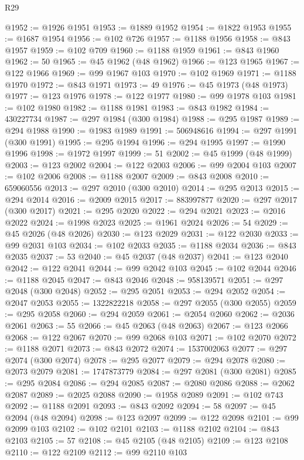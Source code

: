 \begin{lexlean}{R29}
\begin{coremodule}
@1952 := @1926 @1951
@1953 := @1889 @1952
@1954 := @1822 @1953
@1955 := @1687 @1954
@1956 := @102 @726
@1957 := @1188 @1956
@1958 := @843 @1957
@1959 := @102 @709
@1960 := @1188 @1959
@1961 := @843 @1960
@1962 := 50
@1965 := @45 @1962 (@48 @1962)
@1966 := @123 @1965
@1967 := @122 @1966
@1969 := @99 @1967 @103
@1970 := @102 @1969
@1971 := @1188 @1970
@1972 := @843 @1971
@1973 := 49
@1976 := @45 @1973 (@48 @1973)
@1977 := @123 @1976
@1978 := @122 @1977
@1980 := @99 @1978 @103
@1981 := @102 @1980
@1982 := @1188 @1981
@1983 := @843 @1982
@1984 := 430227734
@1987 := @297 @1984 (@300 @1984)
@1988 := @295 @1987
@1989 := @294 @1988
@1990 := @1983 @1989
@1991 := 506948616
@1994 := @297 @1991 (@300 @1991)
@1995 := @295 @1994
@1996 := @294 @1995
@1997 := @1990 @1996
@1998 := @1972 @1997
@1999 := 51
@2002 := @45 @1999 (@48 @1999)
@2003 := @123 @2002
@2004 := @122 @2003
@2006 := @99 @2004 @103
@2007 := @102 @2006
@2008 := @1188 @2007
@2009 := @843 @2008
@2010 := 659060556
@2013 := @297 @2010 (@300 @2010)
@2014 := @295 @2013
@2015 := @294 @2014
@2016 := @2009 @2015
@2017 := 883997877
@2020 := @297 @2017 (@300 @2017)
@2021 := @295 @2020
@2022 := @294 @2021
@2023 := @2016 @2022
@2024 := @1998 @2023
@2025 := @1961 @2024
@2026 := 54
@2029 := @45 @2026 (@48 @2026)
@2030 := @123 @2029
@2031 := @122 @2030
@2033 := @99 @2031 @103
@2034 := @102 @2033
@2035 := @1188 @2034
@2036 := @843 @2035
@2037 := 53
@2040 := @45 @2037 (@48 @2037)
@2041 := @123 @2040
@2042 := @122 @2041
@2044 := @99 @2042 @103
@2045 := @102 @2044
@2046 := @1188 @2045
@2047 := @843 @2046
@2048 := 958139571
@2051 := @297 @2048 (@300 @2048)
@2052 := @295 @2051
@2053 := @294 @2052
@2054 := @2047 @2053
@2055 := 1322822218
@2058 := @297 @2055 (@300 @2055)
@2059 := @295 @2058
@2060 := @294 @2059
@2061 := @2054 @2060
@2062 := @2036 @2061
@2063 := 55
@2066 := @45 @2063 (@48 @2063)
@2067 := @123 @2066
@2068 := @122 @2067
@2070 := @99 @2068 @103
@2071 := @102 @2070
@2072 := @1188 @2071
@2073 := @843 @2072
@2074 := 1537002063
@2077 := @297 @2074 (@300 @2074)
@2078 := @295 @2077
@2079 := @294 @2078
@2080 := @2073 @2079
@2081 := 1747873779
@2084 := @297 @2081 (@300 @2081)
@2085 := @295 @2084
@2086 := @294 @2085
@2087 := @2080 @2086
@2088 := @2062 @2087
@2089 := @2025 @2088
@2090 := @1958 @2089
@2091 := @102 @743
@2092 := @1188 @2091
@2093 := @843 @2092
@2094 := 58
@2097 := @45 @2094 (@48 @2094)
@2098 := @123 @2097
@2099 := @122 @2098
@2101 := @99 @2099 @103
@2102 := @102 @2101
@2103 := @1188 @2102
@2104 := @843 @2103
@2105 := 57
@2108 := @45 @2105 (@48 @2105)
@2109 := @123 @2108
@2110 := @122 @2109
@2112 := @99 @2110 @103

\end{coremodule}
\end{lexlean}
